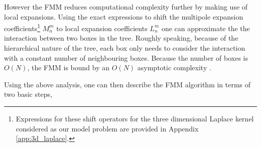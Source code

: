 However the FMM reduces computational complexity further by making use of local
expansions. Using the exact expressions to shift the multipole expansion
coefficients\footnote{Expressions for these shift operators for the three dimensional
Laplace kernel considered as our model problem are provided in Appendix \ref{app:3d_laplace}.}
$M_n^m$ to local expansion coefficients $L_n^m$ one can approximate the the interaction
between two boxes in the tree. Roughly speaking, because of the hierarchical
nature of the tree, each box only needs to consider the interaction with a
constant number of neighbouring boxes. Because the number of boxes is $O(N)$,
the FMM is bound by an $O(N)$ asymptotic complexity \cite{Hwu:2011:MKP}.

Using the above analysis, one can then describe the FMM algorithm in terms of
two basic steps,

